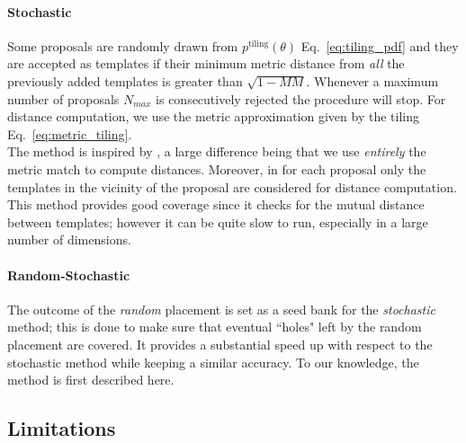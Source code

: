 \documentclass[twocolumn,showpacs,preprintnumbers,nofootinbib,prd,
superscriptaddress,10pt]{revtex4-2}
\begin{document}
\paragraph{Stochastic}\label{par:stochastic}
Some proposals are randomly drawn from $p^{\text{tiling}}(\theta)$ Eq.~\eqref{eq:tiling_pdf} and they are accepted as templates if their minimum metric distance from {\it all} the previously added templates is greater than  $\sqrt{1-MM}$.
Whenever a maximum number of proposals $N_{max}$ is consecutively rejected the procedure will stop. For distance computation, we use the metric approximation given by the tiling Eq.~\eqref{eq:metric_tiling}.
\\
The method is inspired by \cite{PhysRevD.80.104014}, a large difference being that we use {\it entirely} the metric match to compute distances. Moreover, in \cite{PhysRevD.80.104014} for each proposal only the templates in the vicinity of the proposal are considered for distance computation.
This method provides good coverage since it checks for the mutual distance between templates; however it can be quite slow to run, especially in a large number of dimensions.

\paragraph{Random-Stochastic}\label{par:randomstochastic}
The outcome of the {\it random} placement is set as a seed bank for the {\it stochastic} method; this is done to make sure that eventual ``holes" left by the random placement are covered. It provides a substantial speed up with respect to the stochastic method while keeping a similar accuracy.
To our knowledge, the method is first described here.



\subsection{Limitations} \label{sec:limitations}
\end{document}
